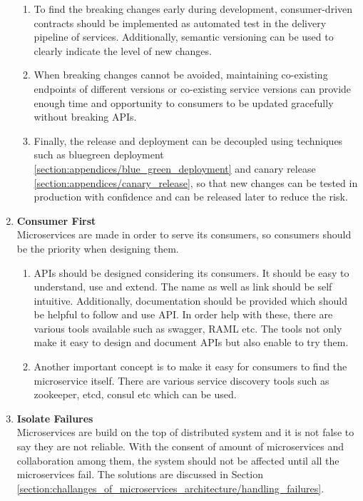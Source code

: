 \begin{enumerate}
\begin{enumerate}
\item To find the breaking changes early during development, consumer-driven contracts should be implemented as automated test in the delivery pipeline of services. Additionally, semantic versioning can be used to clearly indicate the level of new changes.
\item When breaking changes cannot be avoided, maintaining co-existing endpoints of different versions or co-existing service versions can provide enough time and opportunity to consumers to be updated gracefully without breaking \acrshort{API}s.
\item Finally, the release and deployment can be decoupled using techniques such as bluegreen deployment \ref{section:appendices/blue_green_deployment} and canary release \ref{section:appendices/canary_release}, so that new changes can be tested in production with confidence and can be released later to reduce the risk.
\end{enumerate}
\item \textbf{Consumer First}\\
Microservices are made in order to serve its consumers, so consumers should be the priority when designing them.
\begin{enumerate}
\item \acrshort{API}s should be designed considering its consumers. It should be easy to understand, use and extend. The name as well as link should be self intuitive. Additionally, documentation should be provided which should be helpful to follow and use \acrshort{API}. In order help with these, there are various tools available such as swagger, RAML etc. The tools not only make it easy to design and document \acrshort{API}s but also enable to try them.\cite{Bloch:2016aa} \cite{Blanchette:2008aa}
\item Another important concept is to make it easy for consumers to find the microservice itself. There are various service discovery tools such as zookeeper, etcd, consul etc which can be used.
\end{enumerate}
\item \textbf{Isolate Failures}\\
Microservices are build on the top of distributed system and it is not false to say they are not reliable.\cite{Factor:2014aa} With the consent of amount of microservices and collaboration among them, the system should not be affected until all the microservices fail. The solutions are discussed in Section \ref{section:challanges_of_microservices_architecture/handling_failures}.

\end{enumerate}
